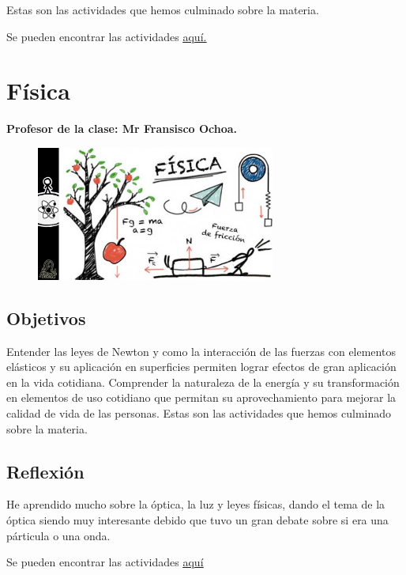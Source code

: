 \documentclass[a4paper, 12pt]{article}
\begin{document}
Estas son las actividades que hemos culminado sobre la materia.

Se pueden encontrar las actividades \href{https://drive.google.com/drive/folders/1PRIU_AXDg9u1KO9Lou-fAq308nmebbqo?usp=sharing}{\underline{aquí.}}

\section{Física}
\textbf{Profesor de la clase: Mr Fransisco Ochoa.}

\begin{figure}[h]
  \includegraphics[width=0.7\textwidth, center]{fisi.jpeg}
\end{figure}

\subsection{Objetivos}
Entender las leyes de Newton y como la interacción de las fuerzas con elementos elásticos y su aplicación en superficies permiten lograr efectos de gran aplicación en la vida cotidiana. Comprender la naturaleza de la energía y su transformación en elementos de uso cotidiano que permitan su aprovechamiento para mejorar la calidad de vida de las personas.
Estas son las actividades que hemos culminado sobre la materia.

\subsection{Reflexión}
He aprendido mucho sobre la óptica, la luz y leyes físicas, dando el tema de la óptica siendo muy interesante debido que tuvo un gran debate sobre si era una párticula o una onda.

Se pueden encontrar las actividades \href{https://drive.google.com/drive/folders/1TrRKvzmpVNuXv89DHbMKKkIT746Uk8yG?usp=sharing}{\underline{aquí}}
\end{document}
